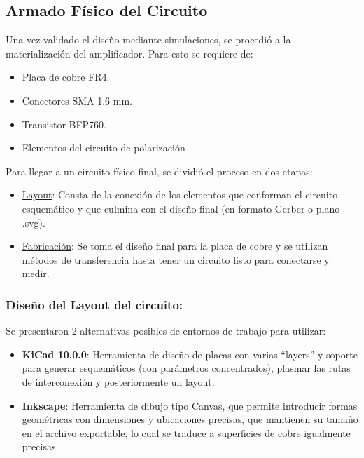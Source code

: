 \documentclass{article}
\begin{document}
 
\subsection{Armado Físico del Circuito} \label{section:sec_3.8}
Una vez validado el diseño mediante simulaciones, se procedió a la materialización del amplificador. Para esto se requiere de: 
\begin{itemize}
    \item Placa de cobre FR4.
    \item Conectores SMA 1.6 mm.
    \item Transistor BFP760.
    \item Elementos del circuito de polarización
\end{itemize}

Para llegar a un circuito físico final, se dividió el proceso en dos etapas:

\begin{itemize}
\item \underline{Layout}: Consta de la conexión de los elementos que conforman el circuito esquemático y que culmina con el diseño final (en formato Gerber o plano .svg).
\item \underline{Fabricación}: Se toma el diseño final para la placa de cobre y se utilizan métodos de transferencia hasta tener un circuito listo para conectarse y medir.
\end{itemize}


\subsubsection{Diseño del Layout del circuito:}

Se presentaron 2 alternativas posibles de entornos de trabajo para utilizar:

\begin{itemize}
    
    \item \textbf{KiCad 10.0.0}: Herramienta de diseño de placas con varias ``layers'' y soporte para generar esquemáticos (con parámetros concentrados), plasmar las rutas de interconexión y posteriormente un layout.
    
    \item \textbf{Inkscape}: Herramienta de dibujo tipo Canvas, que permite introducir formas geométricas con dimensiones y ubicaciones precisas, que mantienen su tamaño en el archivo exportable, lo cual se traduce a superficies de cobre igualmente precisas.
    
\end{itemize}
\end{document}

